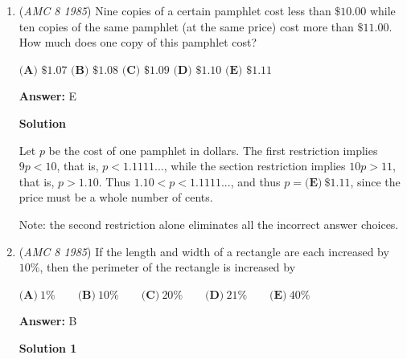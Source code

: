 \begin{enumerate}
 If we increase the seventh test score by $7$, the average will increase by $\frac{7}{7}=1$. We need the average to increase by $85-72=13$, so the seventh test score is $7\times 13=91$ more than $0$, which is clearly $\boxed{\textbf{(D)}\ 91}$.

 



\textbf{Solution 3 (Answer Choices)}

Since $84$ is divisible by $7$, your total score on your first $6$ tests, that is, $6 \cdot 84$, is divisible by $7$.  Also, your total score on your first $7$ tests, that is, $85 \cdot 7$, must be divisible by $7$.  Therefore, your score on your $7^{\text{th}}$ test is also divisible by $7$. Of the answer choices, only $\boxed{\textbf{(D)}\ 91}$ is divisible by $7$.

 


	\item (\textit{AMC 8 1985}) Nine copies of a certain pamphlet cost less than $\$10.00$ while ten copies of the same pamphlet (at the same price) cost more than $\$11.00$.  How much does one copy of this pamphlet cost?


 $\textbf{(A)}$ $\$1.07$
$\textbf{(B)}$ $\$1.08$
$\textbf{(C)}$ $\$1.09$
$\textbf{(D)}$ $\$1.10$
$\textbf{(E)}$ $\$1.11$

 \textbf{Answer: }E



\textbf{Solution}

Let $p$ be the cost of one pamphlet in dollars. The first restriction implies $9p<10$, that is, $p<1.1111...$, while the section restriction implies $10p>11$, that is, $p>1.10$.  Thus $1.10 < p < 1.1111...$, and thus $p = \boxed{\textbf{(E)}\ \$1.11}$, since the price must be a whole number of cents.

 Note: the second restriction alone eliminates all the incorrect answer choices.

 


	\item (\textit{AMC 8 1985}) If the length and width of a rectangle are each increased by $10\%$, then the perimeter of the rectangle is increased by


 $\textbf{(A)}\ 1\% \qquad \textbf{(B)}\ 10\% \qquad \textbf{(C)}\ 20\% \qquad \textbf{(D)}\ 21\% \qquad \textbf{(E)}\ 40\%$

 \textbf{Answer: }B



\textbf{Solution 1}


\end{enumerate}
